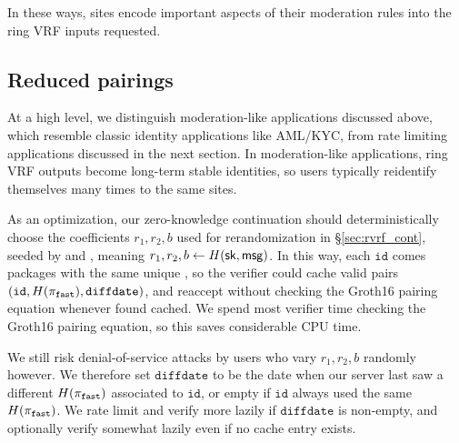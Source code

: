 In these ways, sites encode important aspects of their moderation rules
into the ring VRF inputs requested.  


\subsection{Reduced pairings}
\label{sec:reduced_pairings}

At a high level, we distinguish moderation-like applications discussed
above, which resemble classic identity applications like AML/KYC, from
rate limiting applications discussed in the next section. 
%
In moderation-like applications, ring VRF outputs become long-term
stable identities, so users typically reidentify themselves many times
to the same sites.

As an optimization, our zero-knowledge continuation
should deterministically choose the coefficients $r_1,r_2,b$ used for
rerandomization in \S\ref{sec:rvrf_cont},
 seeded by \msg and \sk, meaning $r_1,r_2,b \leftarrow H(\mathsf{sk},\mathsf{msg})$. 
%
In this way, each $\mathtt{id}$ comes packages with the same unique %
\pifast, so the verifier could cache valid pairs
$(\mathtt{id},H(\pi_{\mathtt{fast}}),\mathtt{diffdate})$, and reaccept \pifast
without checking the Groth16 pairing equation whenever found cached.
%
We spend most verifier time checking the Groth16 pairing equation, so
this saves considerable CPU time. %

We still risk denial-of-service attacks by users who vary $r_1,r_2,b$ 
randomly however.  We therefore set $\mathtt{diffdate}$ to be the date
when our server last saw a different $H(\pi_{\mathtt{fast}})$ associated to
$\mathtt{id}$, or empty if $\mathtt{id}$ always used the same $H(\pi_{\mathtt{fast}})$.
We rate limit and verify more lazily if $\mathtt{diffdate}$ is non-empty,
and optionally verify somewhat lazily even if no cache entry exists.

